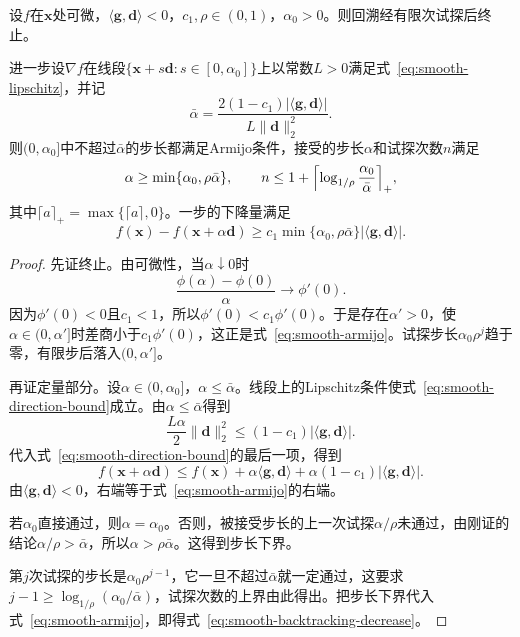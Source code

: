 \begin{theorem}[回溯的终止与步长下界]
\label{thm:smooth-backtracking}
设$f$在$\bm{x}$处可微，$\langle\bm{g},\bm{d}\rangle<0$，$c_1,\rho\in(0,1)$，$\alpha_0>0$。则回溯经有限次试探后终止。

进一步设$\nabla f$在线段$\{\bm{x}+s\bm{d}:s\in[0,\alpha_0]\}$上以常数$L>0$满足式~\eqref{eq:smooth-lipschitz}，并记
\begin{equation}
 \bar{\alpha}=\frac{2(1-c_1)\lvert\langle\bm{g},\bm{d}\rangle\rvert}{L\lVert\bm{d}\rVert_2^2}.
 \label{eq:smooth-armijo-threshold}
\end{equation}
则$(0,\alpha_0]$中不超过$\bar{\alpha}$的步长都满足Armijo条件，接受的步长$\alpha$和试探次数$n$满足
\begin{equation}
 \alpha\geq\min\{\alpha_0,\rho\bar{\alpha}\},\qquad
 n\leq1+\Bigl\lceil\log_{1/\rho}\frac{\alpha_0}{\bar{\alpha}}\Bigr\rceil_+,
 \label{eq:smooth-backtracking-bounds}
\end{equation}
其中$\lceil a\rceil_+=\max\{\lceil a\rceil,0\}$。一步的下降量满足
\begin{equation}
 f(\bm{x})-f(\bm{x}+\alpha\bm{d})\geq c_1\min\{\alpha_0,\rho\bar{\alpha}\}\lvert\langle\bm{g},\bm{d}\rangle\rvert.
 \label{eq:smooth-backtracking-decrease}
\end{equation}
\end{theorem}

\begin{proof}
先证终止。由可微性，当$\alpha\downarrow0$时
\[
 \frac{\phi(\alpha)-\phi(0)}{\alpha}\to\phi'(0).
\]
因为$\phi'(0)<0$且$c_1<1$，所以$\phi'(0)<c_1\phi'(0)$。于是存在$\alpha'>0$，使$\alpha\in(0,\alpha']$时差商小于$c_1\phi'(0)$，这正是式~\eqref{eq:smooth-armijo}。试探步长$\alpha_0\rho^{j}$趋于零，有限步后落入$(0,\alpha']$。

再证定量部分。设$\alpha\in(0,\alpha_0]$，$\alpha\leq\bar{\alpha}$。线段上的Lipschitz条件使式~\eqref{eq:smooth-direction-bound}成立。由$\alpha\leq\bar{\alpha}$得到
\[
 \frac{L\alpha}{2}\lVert\bm{d}\rVert_2^2\leq(1-c_1)\lvert\langle\bm{g},\bm{d}\rangle\rvert.
\]
代入式~\eqref{eq:smooth-direction-bound}的最后一项，得到
\[
 f(\bm{x}+\alpha\bm{d})\leq f(\bm{x})+\alpha\langle\bm{g},\bm{d}\rangle+\alpha(1-c_1)\lvert\langle\bm{g},\bm{d}\rangle\rvert.
\]
由$\langle\bm{g},\bm{d}\rangle<0$，右端等于式~\eqref{eq:smooth-armijo}的右端。

若$\alpha_0$直接通过，则$\alpha=\alpha_0$。否则，被接受步长的上一次试探$\alpha/\rho$未通过，由刚证的结论$\alpha/\rho>\bar{\alpha}$，所以$\alpha>\rho\bar{\alpha}$。这得到步长下界。

第$j$次试探的步长是$\alpha_0\rho^{j-1}$，它一旦不超过$\bar{\alpha}$就一定通过，这要求$j-1\geq\log_{1/\rho}(\alpha_0/\bar{\alpha})$，试探次数的上界由此得出。把步长下界代入式~\eqref{eq:smooth-armijo}，即得式~\eqref{eq:smooth-backtracking-decrease}。
\end{proof}

